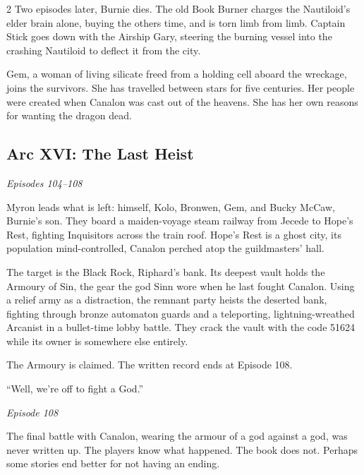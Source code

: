\begin{multicols}{2}
Two episodes later, Burnie dies.  The old Book Burner charges the Nautiloid's elder brain alone, buying the others time, and is torn limb from limb.  Captain Stick goes down with the Airship Gary, steering the burning vessel into the crashing Nautiloid to deflect it from the city.

Gem, a woman of living silicate freed from a holding cell aboard the wreckage, joins the survivors.  She has travelled between stars for five centuries.  Her people were created when Canalon was cast out of the heavens.  She has her own reasons for wanting the dragon dead.

\subsection*{Arc XVI: The Last Heist}
\textit{Episodes 104--108}

\medskip

\noindent
Myron leads what is left: himself, Kolo, Bronwen, Gem, and Bucky McCaw, Burnie's son.  They board a maiden-voyage steam railway from Jecede to Hope's Rest, fighting Inquisitors across the train roof.  Hope's Rest is a ghost city, its population mind-controlled, Canalon perched atop the guildmasters' hall.

The target is the Black Rock, Riphard's bank.  Its deepest vault holds the Armoury of Sin, the gear the god Sinn wore when he last fought Canalon.  Using a relief army as a distraction, the remnant party heists the deserted bank, fighting through bronze automaton guards and a teleporting, lightning-wreathed Arcanist in a bullet-time lobby battle.  They crack the vault with the code 51624 while its owner is somewhere else entirely.

The Armoury is claimed.  The written record ends at Episode 108.

\begin{DndReadAloud}
``Well, we're off to fight a God.''

{\itshape\hfill Episode 108}
\end{DndReadAloud}

The final battle with Canalon, wearing the armour of a god against a god, was never written up.  The players know what happened.  The book does not.  Perhaps some stories end better for not having an ending.

\end{multicols}

\vspace{5mm}

